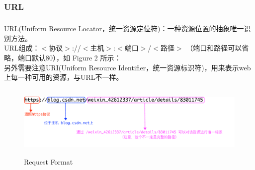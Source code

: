 \documentclass{article}
\begin{document}
	\subsubsection{URL}
	\subparagraph{}
	\begin{CJK}{UTF8}{gbsn}
		URL(Uniform Resource Locator，统一资源定位符)：一种资源位置的抽象唯一识别方法。\\
		URL组成：$<$协议$>$://$<$主机$>$:$<$端口$>$/$<$路径$>$ （端口和路径可以省略，端口默认80），如 Figure 2 所示： \\
		另外需要注意URI(Uniform Resource Identifier，统一资源标识符)，用来表示web上每一种可用的资源，与URL不一样。 
	\end{CJK}{}
	\begin{figure}[H]
		\centering
		\includegraphics[height = 3.5cm, width = 16cm]{pics/3_url.png}	
		\caption{Request Format}
	\end{figure}
\end{document}
